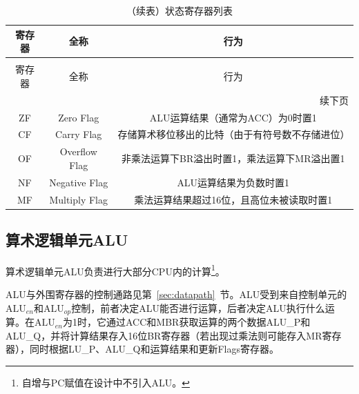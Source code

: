 \documentclass[lang=cn,a4paper,newtx]{elegantpaper}
\begin{document}
\begin{longtable}{c c c}
  \caption{状态寄存器列表} \label{tab:CPU:status} \\
  \toprule
  寄存器 & 全称 & 行为 \\ 
  \midrule
  \endfirsthead

  \caption[]{（续表）状态寄存器列表} \\
  \toprule
  寄存器 & 全称 & 行为\\
  \midrule
  \endhead

  \midrule
  \multicolumn{3}{r}{续下页} \\
  \midrule
  \endfoot

  \bottomrule
  \endlastfoot

  ZF   & Zero Flag             & ALU运算结果（通常为ACC）为0时置1\\
  CF  & Carry Flag     & 存储算术移位移出的比特（由于有符号数不存储进位）\\
  OF  & Overflow Flag &  非乘法运算下BR溢出时置1，乘法运算下MR溢出置1\\
  NF  & Negative Flag &  ALU运算结果为负数时置1\\
  MF & Multiply Flag & 乘法运算结果超过16位，且高位未被读取时置1\\
\end{longtable}
\subsection{算术逻辑单元ALU}
算术逻辑单元ALU负责进行大部分CPU内的计算\footnote{自增与PC赋值在设计中不引入ALU。}。

ALU与外围寄存器的控制通路见第~\ref{sec:datapath}~节。ALU受到来自控制单元的$\text{ALU}_{en}$和$\text{ALU}_{op}$控制，前者决定ALU能否进行运算，后者决定ALU执行什么运算。在$\text{ALU}_{en}$为1时，它通过ACC和MBR获取运算的两个数据ALU\_P和ALU\_Q，并将计算结果存入16位BR寄存器（若出现过乘法则可能存入MR寄存器），同时根据LU\_P、ALU\_Q和运算结果和更新Flags寄存器。
\end{document}
